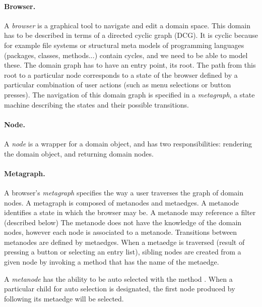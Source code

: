 \documentclass[a4paper,10pt,twoside]{book}
\begin{document}
\paragraph{Browser.} A \emph{browser} is a graphical tool to navigate and edit a domain space. This domain has to be described in terms of a directed cyclic graph (DCG). It is cyclic because for example file systems or structural meta models of programming languages (\ie packages, classes, methods...) contain cycles, and we need to be able to model these. The domain graph has to have an entry point, its root. The path from this root to a particular node corresponds to a state of the browser defined by a particular combination of user actions (such as menu selections or button presses).
The navigation of this domain graph is specified in a \emph{metagraph}, a state machine describing the states and their possible transitions.

\paragraph{Node.} A \emph{node} is a wrapper for a domain object, and has two responsibilities: rendering the domain object, and returning domain nodes.

\paragraph{Metagraph.} A browser's \emph{metagraph} specifies the way a user traverses the graph of domain nodes. A metagraph is composed of metanodes and metaedges. A metanode identifies a state in which the browser may be. A metanode may reference a filter (described below)
The metanode does not have the knowledge of the domain nodes, however each node is associated to a metanode. Transitions between meta\-nodes are defined by metaedges. When a metaedge is traversed (\ie result of pressing a button or selecting an entry list), sibling nodes are created from a given node by invoking a method that has the name of the metaedge.

A \emph{metanode} has the ability to be auto selected with the method . When a particular child for auto selection is designated, the first node produced by following its metaedge will be selected.
\end{document}
